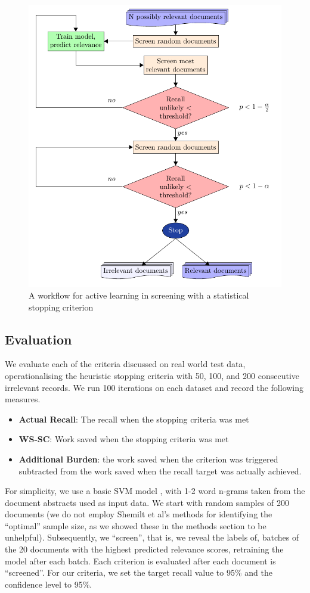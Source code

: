 \documentclass{bmcart}
\begin{document}
	\medskip
	
	\begin{figure}
		\includegraphics[width=0.7\linewidth]{../images/flow}
		\caption{A workflow for active learning in screening with a statistical stopping criterion}
		\label{flow}
	\end{figure}

	\subsection*{Evaluation}
	
	We evaluate each of the criteria discussed on real world test data, operationalising the heuristic stopping criteria with 50, 100, and 200 consecutive irrelevant records. We run 100 iterations on each dataset and record the following measures.
	\begin{itemize}
		\item \textbf{Actual Recall}: The recall when the stopping criteria was met
		\item \textbf{WS-SC}: Work saved when the stopping criteria was met
		\item \textbf{Additional Burden}: the work saved when the criterion was triggered subtracted from the work saved when the recall target was actually achieved.

	\end{itemize}
	For simplicity, we use a basic SVM model \cite{Cortes95, Pedregosa2011}, with 1-2 word n-grams taken from the document abstracts used as input data. We start with random samples of 200 documents (we do not employ Shemilt et al's methods for identifying the ``optimal'' sample size, as we showed these in the methods section to be unhelpful). Subsequently, we ``screen'', that is, we reveal the labels of, batches of the 20 documents with the highest predicted relevance scores, retraining the model after each batch. Each criterion is evaluated after each document is ``screened''.
	 For our criteria, we set the target recall value to 95\% and the confidence level to 95\%.
	
\end{document}
